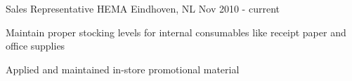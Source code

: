 \begin{cventries}
  \cventry
    {Sales Representative} %
    {HEMA} %
    {Eindhoven, NL} %
    {Nov 2010 - current} %
    {
      \begin{cvitems} %
        \item {Maintain proper stocking levels for internal consumables like receipt paper and office supplies}
        \item {Applied and maintained in-store promotional material}
      \end{cvitems}
    }

\end{cventries}

